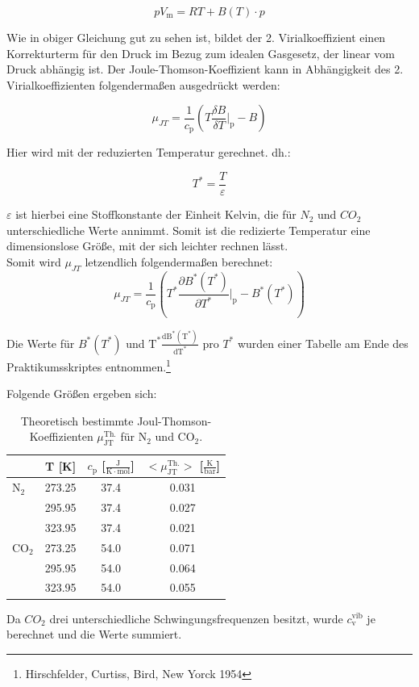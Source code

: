 \documentclass[a4paper,12pt,oneside,onecolum,final,openany]{report}
\begin{document}
\begin{equation}
pV_\mathrm{m} = RT + B(T) \cdot p
\end{equation}

Wie in obiger Gleichung gut zu sehen ist, bildet der 2. Virialkoeffizient einen Korrekturterm für den Druck im Bezug zum idealen Gasgesetz, der linear vom Druck abhängig ist.
Der Joule-Thomson-Koeffizient kann in Abhängigkeit des 2. Virialkoeffizienten folgendermaßen ausgedrückt werden:

\begin{equation}
\mu_{JT} = \frac{1}{c_\mathrm{p}}\left( T \frac{\delta B}{\delta T} \bigg \vert_\mathrm{p} - B\right)
\end{equation}

Hier wird mit der reduzierten Temperatur gerechnet. dh.: 

\begin{equation}
T^* = \frac{T}{\varepsilon}
\end{equation}

$\varepsilon$ ist hierbei eine Stoffkonstante der Einheit Kelvin, die für $N_\mathrm{2}$ und $CO_\mathrm{2}$ unterschiedliche Werte annimmt. Somit ist die redizierte Temperatur eine dimensionslose Größe, mit der sich leichter rechnen lässt.\\ 
Somit wird $\mu_{JT}$ letzendlich folgendermaßen berechnet:\\

\begin{equation}
\mu_{JT} = \frac{1}{c_\mathrm{p}}\left( T^* \frac{\partial B^*(T^*)}{\partial T^*} \bigg \vert_\mathrm{p} - B^*(T^*)\right)
\end{equation}

Die Werte für $B^*(T^*)$ und $\mathrm{T^*}\frac{\mathrm{dB^*(T^*)}}{\mathrm{dT^*}}$ pro $T^*$ wurden einer Tabelle am Ende des Praktikumsskriptes entnommen.\protect\footnote{Hirschfelder, Curtiss, Bird, New Yorck 1954}

Folgende Größen ergeben sich:\\

\begin{table} [h]
\centering
\caption{Theoretisch bestimmte Joul-Thomson-Koeffizienten $\mu_{\text{JT}}^{\text{Th.}}$ für $\text{N}_2$  und $\text{CO}_2$.}
\begin{tabular} {l | c|  c | c}
	 &  T [K] &  $c_\mathrm{p}$ [$\frac{\mathrm{J}}{\mathrm{K}\cdot \mathrm{mol}}$] & $ <\mu_{\text{JT}}^{\text{Th.}}>$ [$\frac{\mathrm{K}}{\mathrm{bar}}$] \\
	 \hline
	  $\text{N}_\mathrm{2}$ & 273.25 & 37.4 &  0.031\\
	   & 295.95 & 37.4 & 0.027\\
	  & 323.95 & 37.4 & 0.021 \\
	\hline
	$\text{CO}_2$ & 273.25& 54.0&0.071  \\
	& 295.95 & 54.0& 0.064\\
	& 323.95& 54.0& 0.055\\
\end{tabular}
\end{table}
Da $CO_2$ drei unterschiedliche Schwingungsfrequenzen besitzt, wurde $c_\mathrm{v}^\mathrm{ vib}$ je berechnet und die Werte summiert.\\
\end{document}
